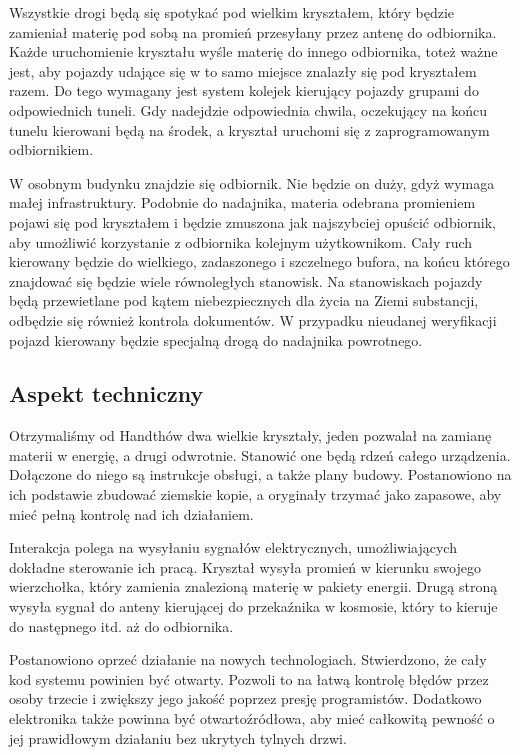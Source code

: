 Wszystkie drogi będą się spotykać pod wielkim kryształem, który będzie zamieniał materię pod sobą na promień przesyłany przez antenę do odbiornika.
Każde uruchomienie kryształu wyśle materię do innego odbiornika, toteż ważne jest, aby pojazdy udające się w to samo miejsce znalazły się pod kryształem razem.
Do tego wymagany jest system kolejek kierujący pojazdy grupami do odpowiednich tuneli.
Gdy nadejdzie odpowiednia chwila, oczekujący na końcu tunelu kierowani będą na środek, a kryształ uruchomi się z zaprogramowanym odbiornikiem.

W osobnym budynku znajdzie się odbiornik.
Nie będzie on duży, gdyż wymaga małej infrastruktury.
Podobnie do nadajnika, materia odebrana promieniem pojawi się pod kryształem i będzie zmuszona jak najszybciej opuścić odbiornik, aby umożliwić korzystanie z odbiornika kolejnym użytkownikom.
Cały ruch kierowany będzie do wielkiego, zadaszonego i szczelnego bufora, na końcu którego znajdować się będzie wiele równoległych stanowisk.
Na stanowiskach pojazdy będą przewietlane pod kątem niebezpiecznych dla życia na Ziemi substancji, odbędzie się również kontrola dokumentów.
W przypadku nieudanej weryfikacji pojazd kierowany będzie specjalną drogą do nadajnika powrotnego.

\subsection{Aspekt techniczny}
Otrzymaliśmy od Handthów dwa wielkie kryształy, jeden pozwalał na zamianę materii w energię, a drugi odwrotnie. 
Stanowić one będą rdzeń całego urządzenia. 
Dołączone do niego są instrukcje obsługi, a także plany budowy.
Postanowiono na ich podstawie zbudować ziemskie kopie, a oryginały trzymać jako zapasowe, aby mieć pełną kontrolę nad ich działaniem.

Interakcja polega na wysyłaniu sygnałów elektrycznych, umożliwiających dokładne sterowanie ich pracą.
Kryształ wysyła promień w kierunku swojego wierzchołka, który zamienia znalezioną materię w pakiety energii.
Drugą stroną wysyła sygnał do anteny kierującej do przekaźnika w kosmosie, który to kieruje do następnego itd. aż do odbiornika.

Postanowiono oprzeć działanie na nowych technologiach.
Stwierdzono, że cały kod systemu powinien być otwarty.
Pozwoli to na łatwą kontrolę błędów przez osoby trzecie i zwiększy jego jakość poprzez presję programistów.
Dodatkowo elektronika także powinna być otwartoźródłowa, aby mieć całkowitą pewność o jej prawidłowym działaniu bez ukrytych tylnych drzwi.

